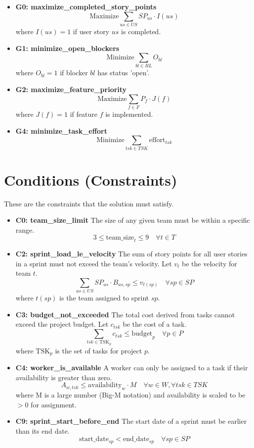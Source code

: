 \documentclass{article}
\begin{document}
\begin{itemize}
    \item \textbf{G0: maximize\_completed\_story\_points}
    $$ \text{Maximize} \sum_{us \in US} SP_{us} \cdot I(us) $$
    where $I(us)=1$ if user story $us$ is completed.

    \item \textbf{G1: minimize\_open\_blockers}
    $$ \text{Minimize} \sum_{bl \in BL} O_{bl} $$
    where $O_{bl}=1$ if blocker $bl$ has status 'open'.

    \item \textbf{G2: maximize\_feature\_priority}
    $$ \text{Maximize} \sum_{f \in F} P_f \cdot J(f) $$
    where $J(f)=1$ if feature $f$ is implemented.
    
    \item \textbf{G4: minimize\_task\_effort}
    $$ \text{Minimize} \sum_{tsk \in TSK} \text{effort}_{tsk} $$
\end{itemize}

\section{Conditions (Constraints)}
These are the constraints that the solution must satisfy.
\begin{itemize}
    \item \textbf{C0: team\_size\_limit}
    The size of any given team must be within a specific range.
    $$ 3 \le \text{team\_size}_t \le 9 \quad \forall t \in T $$

    \item \textbf{C2: sprint\_load\_le\_velocity}
    The sum of story points for all user stories in a sprint must not exceed the team's velocity. Let $v_t$ be the velocity for team $t$.
    $$ \sum_{us \in US} SP_{us} \cdot B_{us, sp} \le v_{t(sp)} \quad \forall sp \in SP $$
    where $t(sp)$ is the team assigned to sprint $sp$.

    \item \textbf{C3: budget\_not\_exceeded}
    The total cost derived from tasks cannot exceed the project budget. Let $c_{tsk}$ be the cost of a task.
    $$ \sum_{tsk \in \text{TSK}_p} c_{tsk} \le \text{budget}_p \quad \forall p \in P $$
    where $\text{TSK}_p$ is the set of tasks for project $p$.

    \item \textbf{C4: worker\_is\_available}
    A worker can only be assigned to a task if their availability is greater than zero.
    $$ A_{w, tsk} \le \text{availability}_w \cdot M \quad \forall w \in W, \forall tsk \in TSK $$
    where M is a large number (Big-M notation) and availability is scaled to be $>0$ for assignment.

    \item \textbf{C9: sprint\_start\_before\_end}
    The start date of a sprint must be earlier than its end date.
    $$ \text{start\_date}_{sp} < \text{end\_date}_{sp} \quad \forall sp \in SP $$
\end{itemize}
\end{document}
